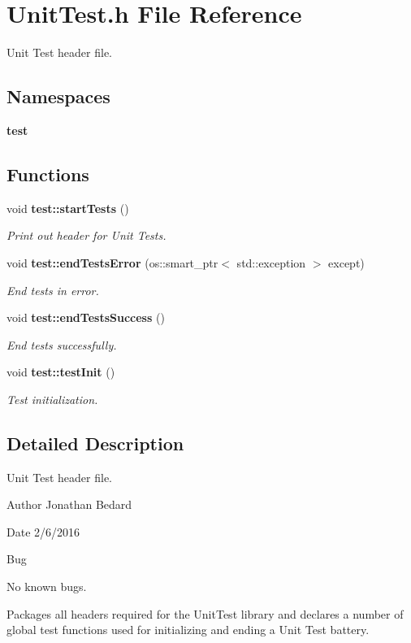 \section{Unit\+Test.\+h File Reference}
\label{UnitTest_8h}


Unit Test header file.  


\subsection*{Namespaces}
\begin{DoxyCompactItemize}
\item 
 {\bf test}
\end{DoxyCompactItemize}
\subsection*{Functions}
\begin{DoxyCompactItemize}
\item 
void {\bf test\+::start\+Tests} ()
\begin{DoxyCompactList}\small\item\em Print out header for Unit Tests. \end{DoxyCompactList}\item 
void {\bf test\+::end\+Tests\+Error} (os\+::smart\+\_\+ptr$<$ std\+::exception $>$ except)
\begin{DoxyCompactList}\small\item\em End tests in error. \end{DoxyCompactList}\item 
void {\bf test\+::end\+Tests\+Success} ()
\begin{DoxyCompactList}\small\item\em End tests successfully. \end{DoxyCompactList}\item 
void {\bf test\+::test\+Init} ()
\begin{DoxyCompactList}\small\item\em Test initialization. \end{DoxyCompactList}\end{DoxyCompactItemize}


\subsection{Detailed Description}
Unit Test header file. 

\begin{DoxyAuthor}{Author}
Jonathan Bedard 
\end{DoxyAuthor}
\begin{DoxyDate}{Date}
2/6/2016 
\end{DoxyDate}
\begin{DoxyRefDesc}{Bug}
\item[{\bf Bug}]No known bugs.\end{DoxyRefDesc}


Packages all headers required for the Unit\+Test library and declares a number of global test functions used for initializing and ending a Unit Test battery. 